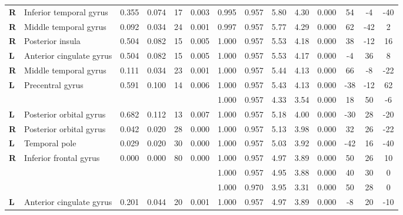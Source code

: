 \begin{landscape}
\begin{table}[!ht]
\begin{tabular}{ll|cccc|ccccc|ccc}
        \textbf{R} & Inferior temporal gyrus & 0.355 & 0.074 & 17 & 0.003 & 0.995 & 0.957 & 5.80 & 4.30 & 0.000 & 54 & -4 & -40 \\
        \textbf{R} & Middle temporal gyrus & 0.092 & 0.034 & 24 & 0.001 & 0.997 & 0.957 & 5.77 & 4.29 & 0.000 & 62 & -42 & 2 \\
        \textbf{R} & Posterior insula & 0.504 & 0.082 & 15 & 0.005 & 1.000 & 0.957 & 5.53 & 4.18 & 0.000 & 38 & -12 & 16 \\
        \textbf{L} & Anterior cingulate gyrus & 0.504 & 0.082 & 15 & 0.005 & 1.000 & 0.957 & 5.53 & 4.17 & 0.000 & -4 & 36 & 8 \\
        \textbf{R} & Middle temporal gyrus & 0.111 & 0.034 & 23 & 0.001 & 1.000 & 0.957 & 5.44 & 4.13 & 0.000 & 66 & -8 & -22 \\
        \textbf{L} & Precentral gyrus & 0.591 & 0.100 & 14 & 0.006 & 1.000 & 0.957 & 5.43 & 4.13 & 0.000 & -38 & -12 & 62 \\
        \textbf{} & & & & & & 1.000 & 0.957 & 4.33 & 3.54 & 0.000 & 18 & 50 & -6 \\
        \textbf{L} & Posterior orbital gyrus & 0.682 & 0.112 & 13 & 0.007 & 1.000 & 0.957 & 5.18 & 4.00 & 0.000 & -30 & 28 & -20 \\
        \textbf{R} & Posterior orbital gyrus & 0.042 & 0.020 & 28 & 0.000 & 1.000 & 0.957 & 5.13 & 3.98 & 0.000 & 32 & 26 & -22 \\
        \textbf{L} & Temporal pole & 0.029 & 0.020 & 30 & 0.000 & 1.000 & 0.957 & 5.03 & 3.92 & 0.000 & -42 & 16 & -40 \\
        \textbf{R} & Inferior frontal gyrus & 0.000 & 0.000 & 80 & 0.000 & 1.000 & 0.957 & 4.97 & 3.89 & 0.000 & 50 & 26 & 10 \\
        \textbf{} & & & & & & 1.000 & 0.957 & 4.95 & 3.88 & 0.000 & 40 & 30 & 0 \\
        \textbf{} & & & & & & 1.000 & 0.970 & 3.95 & 3.31 & 0.000 & 50 & 28 & 0 \\
        \textbf{L} & Anterior cingulate gyrus & 0.201 & 0.044 & 20 & 0.001 & 1.000 & 0.957 & 4.97 & 3.89 & 0.000 & -8 & 20 & -10 \\

\end{tabular}
\end{table}
\end{landscape}
